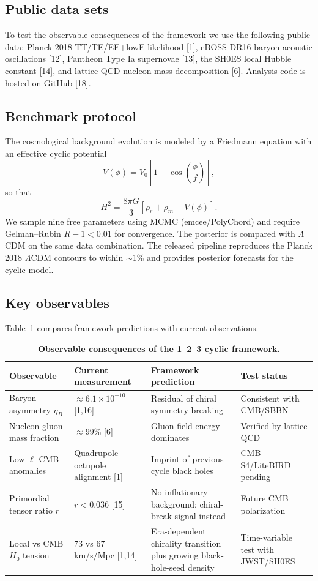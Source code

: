 \documentclass[11pt,a4paper]{article}
\begin{document}
\subsection{Public data sets}
To test the observable consequences of the framework we use the following public data: Planck 2018 TT/TE/EE+lowE likelihood [1], eBOSS DR16 baryon acoustic oscillations [12], Pantheon Type Ia supernovae [13], the SH0ES local Hubble constant [14], and lattice-QCD nucleon-mass decomposition [6]. Analysis code is hosted on GitHub [18].

\subsection{Benchmark protocol}
The cosmological background evolution is modeled by a Friedmann equation with an effective cyclic potential
\begin{equation}
V(\phi)=V_0\left[1+\cos\left(\frac{\phi}{f}\right)\right],
\end{equation}
so that
\begin{equation}
H^2=\frac{8\pi G}{3}\left[\rho_r+\rho_m+V(\phi)\right].
\end{equation}
We sample nine free parameters using MCMC (emcee/PolyChord) and require Gelman--Rubin $R-1<0.01$ for convergence. The posterior is compared with $\Lambda$CDM on the same data combination. The released pipeline reproduces the Planck 2018 $\Lambda$CDM contours to within $\sim$1\% and provides posterior forecasts for the cyclic model.

\subsection{Key observables}
Table~\ref{tab:predictions} compares framework predictions with current observations.

\begin{table}[htbp]
\centering
\caption{\textbf{Observable consequences of the 1--2--3 cyclic framework.}}
\label{tab:predictions}
\small
\begin{tabular}{@{}p{2.6cm}p{3.5cm}p{4.8cm}p{2.2cm}@{}}
\toprule
Observable & Current measurement & Framework prediction & Test status \\
\midrule
Baryon asymmetry $\eta_B$ & $\approx6.1\times10^{-10}$ [1,16] & Residual of chiral symmetry breaking & Consistent with CMB/SBBN \\
Nucleon gluon mass fraction & $\approx99\%$ [6] & Gluon field energy dominates & Verified by lattice QCD \\
Low-$\ell$ CMB anomalies & Quadrupole--octupole alignment [1] & Imprint of previous-cycle black holes & CMB-S4/LiteBIRD pending \\
Primordial tensor ratio $r$ & $r<0.036$ [15] & No inflationary background; chiral-break signal instead & Future CMB polarization \\
Local vs CMB $H_0$ tension & 73 vs 67 km/s/Mpc [1,14] & Era-dependent chirality transition plus growing black-hole-seed density & Time-variable test with JWST/SH0ES \\
\bottomrule
\end{tabular}
\end{table}
\end{document}
